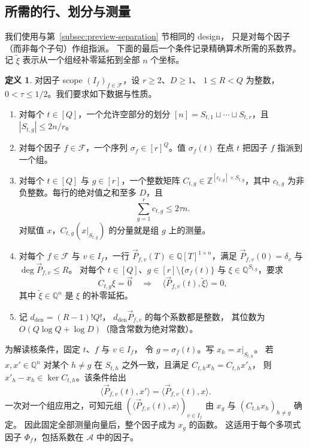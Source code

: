 \documentclass[11pt,reqno]{amsart}
\numberwithin{equation}{section}
\theoremstyle{definition}\newtheorem{definition}[theorem]{定义}
\theoremstyle{remark}\newtheorem{remark}[theorem]{注}
\renewcommand{\le}{\leqslant}
\renewcommand{\ge}{\geqslant}
\begin{document}
\subsection{所需的行、划分与测量}
\label{subsec:layout-interface}
我们使用与第~\ref{subsec:preview-separation} 节相同的 design，
只是对每个因子（而非每个子句）作组指派。
下面的最后一个条件记录精确算术所需的系数界。
记 $\widetilde\xi$ 表示从一个组经补零延拓到全部 $n$ 个坐标。

\begin{definition}\label{def:layout}
对因子 scope $(I_f)_{f\in\mathcal F}$，设 $r\ge2$、$D\ge1$、
$1\le R<Q$ 为整数，$0<\tau\le1/2$。我们要求如下数据与性质。
\begin{enumerate}
\item 对每个 $t\in[Q]$，一个允许空部分的划分
$[n]=S_{t,1}\sqcup\cdots\sqcup S_{t,r}$，且
$|S_{t,g}|\le2n/r$。
\item 对每个因子 $f\in\mathcal F$，一个序列
$\sigma_f\in[r]^Q$。值 $\sigma_f(t)$ 在点 $t$
把因子 $f$ 指派到一个组。
\item 对每个 $t\in[Q]$ 与 $g\in[r]$，一个整数矩阵
$C_{t,g}\in\mathbb Z^{[c_{t,g}]\times S_{t,g}}$，其中
$c_{t,g}$ 为非负整数。每行的绝对值之和至多 $D$，且
\[
 \sum_{g=1}^r c_{t,g}\le2\tau n.
\]
对赋值 $x$，$C_{t,g}(x|_{S_{t,g}})$ 的分量就是组 $g$
上的测量。
\item 对每个 $f\in\mathcal F$ 与 $v\in I_f$，一行
$\vec{P}_{f,v}(T)\in\mathbb Q[T]^{1\times n}$，满足
$\vec{P}_{f,v}(0)=\delta_v$ 与
$\deg \vec{P}_{f,v}\le R$。
对每个 $t\in[Q]$、$g\in[r]\setminus\{\sigma_f(t)\}$ 与
$\xi\in\mathbb Q^{S_{t,g}}$，要求
\[
 C_{t,g}\xi=\vec{0}\quad\Longrightarrow\quad
 \langle \vec{P}_{f,v}(t), \widetilde\xi\rangle=0,
\]
其中 $\widetilde\xi\in\mathbb Q^n$ 是 $\xi$ 的补零延拓。
\item 记 $d_{\mathrm{den}}=(R-1)!Q!$，
$d_{\mathrm{den}} \vec{P}_{f,v}$ 的每个系数都是整数，
其位数为 $O(Q\log Q+\log D)$（隐含常数为绝对常数）。
\end{enumerate}
\end{definition}

为解读核条件，固定 $t$、$f$ 与 $v\in I_f$，
令 $g=\sigma_f(t)$。写 $x_h=x|_{S_{t,h}}$。
若 $x,x'\in\mathbb Q^n$ 对某个 $h\ne g$ 在 $S_{t,h}$
之外一致，且满足 $C_{t,h}x_h=C_{t,h}x'_h$，
则 $x'_h-x_h\in\ker C_{t,h}$。该条件给出
\[
 \langle \vec{P}_{f,v}(t), x'\rangle=\langle \vec{P}_{f,v}(t), x\rangle.
\]
一次对一个组应用之，可知元组
$(\langle \vec{P}_{f,v}(t), x\rangle)_{v\in I_f}$
由 $x_g$ 与 $(C_{t,h}x_h)_{h\ne g}$ 确定。
因此固定全部测量向量后，整个因子成为 $x_g$ 的函数。
这适用于每个多项式因子 $\Phi_f$，包括系数在 $\mathcal A$
中的因子。
\end{document}
